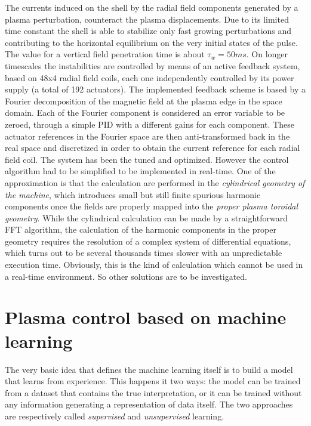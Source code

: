 The currents induced on the shell by the radial field components generated by a plasma perturbation, counteract the plasma displacements. Due to its limited time constant the shell is able to stabilize only fast growing perturbations
and contributing to the horizontal equilibrium on the very initial states of the pulse. The value for a vertical field penetration time is about $\tau_w = 50 ms$.
On longer timescales the instabilities are controlled by means of an active feedback system, based on 48x4 radial field coils, each one independently controlled by its power supply (a total of 192 actuators).
The implemented feedback scheme \cite{ZancaNF2007} is based by a Fourier decomposition  of the magnetic field at the plasma edge in the space domain. Each of the Fourier component is considered an error variable to be zeroed, through a simple PID with a different gains for each component. These actuator references in the Fourier space are then anti-transformed back in the real space and discretized in order to obtain the current reference for each radial field coil.
The system has been the tuned and optimized. However the control algorithm had to be simplified to be implemented in real-time. One of the approximation is that the calculation are performed in the \emph{cylindrical geometry of the machine}, which introduces small but still finite spurious harmonic components once the fields are properly mapped into the \emph{proper plasma toroidal geometry}\cite{ZancaTerranovaPPCF2004}. While the cylindrical calculation can be made by a straightforward FFT algorithm, the calculation of the harmonic components in the proper geometry requires the resolution of a complex system of differential equations, which turns out to be several thousands times slower with an unpredictable execution time.
Obviously, this is the kind of calculation which cannot be used in a real-time environment. So other solutions are to be investigated.

\section{Plasma control based on machine learning}

The very basic idea that defines the machine learning itself is to build a model that learns from experience. This happens it two ways: the model can be trained from a dataset that contains the true interpretation, or it can be trained without any information generating a representation of data itself. The two approaches are respectively called \textit{supervised} and \textit{unsupervised} learning.

